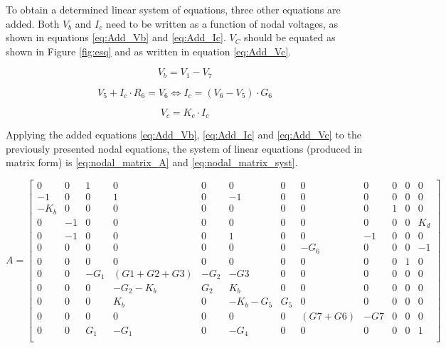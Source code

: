 To obtain a determined linear system of equations, three other equations are added. Both $V_b$ and $I_c$ need to be written as a function of nodal voltages, as shown in equations \ref{eq:Add_Vb} and \ref{eq:Add_Ic}. $V_C$ should be equated as shown in Figure \ref{fig:esq} and as written in equation \ref{eq:Add_Vc}.

\begin{equation}
    V_b = V_1 - V_7
    \label{eq:Add_Vb}
\end{equation}

\begin{equation}
    V_5 + I_c \cdot R_6 = V_6 \Leftrightarrow I_c = (V_6 - V_5) \cdot G_6
    \label{eq:Add_Ic}
\end{equation}

\begin{equation}
    V_c = K_c \cdot I_c
    \label{eq:Add_Vc}
\end{equation}


Applying the added equations \ref{eq:Add_Vb}, \ref{eq:Add_Ic} and \ref{eq:Add_Vc} to the previously presented nodal 
equations, the system of linear equations (produced in matrix form) is \ref{eq:nodal_matrix_A} and \ref{eq:nodal_matrix_syst}.


\begin{equation}
    A =
    \begin{bmatrix}
        0 & 0 & 1 & 0 & 0 & 0 & 0 & 0 & 0 & 0 & 0 & 0\\
        -1 & 0 & 0 & 1 & 0 & -1 & 0 & 0 & 0 & 0 & 0 & 0\\
        -K_b & 0 & 0 & 0 & 0 & 0 & 0 & 0 & 0 & 1 & 0 & 0\\
        0 & -1 & 0 & 0 & 0 & 0 & 0 & 0 & 0 & 0 & 0 & K_d\\
        0 & -1 & 0 & 0 & 0 & 1 & 0 & 0 & -1 & 0 & 0 & 0\\
        0 & 0 & 0 & 0 & 0 & 0 & 0 & -G_6 & 0 & 0 & 0 & -1\\
        0 & 0 & 0 & 0 & 0 & 0 & 0 & 0 & 0 & 0 & 1 & 0\\
        0 & 0 & -G_1 & (G1+G2+G3) & -G_2 & -G3 & 0 & 0 & 0 & 0 & 0 & 0\\
        0 & 0 & 0 & -G_2-K_b & G_2 & K_b & 0 & 0 & 0 & 0 & 0 & 0\\
        0 & 0 & 0 & K_b & 0 & -K_b-G_5 & G_5 & 0 & 0 & 0 & 0 & 0\\
        0 & 0 & 0 & 0 & 0 & 0 & 0 & (G7+G6) & -G7 & 0 & 0 & 0\\
        0 & 0 & G_1 & -G_1 & 0 & -G_4 & 0 & 0 & 0 & 0 & 0 & 1\\
        
    \end{bmatrix}
    \label{eq:nodal_matrix_A}
\end{equation}

